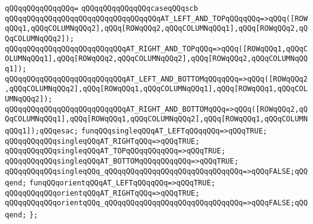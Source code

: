 \verb|qQQqqQQqqQQqqQQq=|\newline
\verb|qQQqqQQqqQQqqQQqcaseqQQqscb|\newline
\verb|qQQqqQQqqQQqqQQqqQQqqQQqqQQqqQQqqQQqAT_LEFT_AND_TOPqQQqqQQq=>qQQq([ROWqQQq1,qQQqCOLUMNqQQq2],qQQq[ROWqQQq2,qQQqCOLUMNqQQq1],qQQq[ROWqQQq2,qQQqCOLUMNqQQq2]);|\newline
\verb|qQQqqQQqqQQqqQQqqQQqqQQqqQQqAT_RIGHT_AND_TOPqQQq=>qQQq([ROWqQQq1,qQQqCOLUMNqQQq1],qQQq[ROWqQQq2,qQQqCOLUMNqQQq2],qQQq[ROWqQQq2,qQQqCOLUMNqQQq1]);|\newline
\verb|qQQqqQQqqQQqqQQqqQQqqQQqqQQqAT_LEFT_AND_BOTTOMqQQqqQQq=>qQQq([ROWqQQq2,qQQqCOLUMNqQQq2],qQQq[ROWqQQq1,qQQqCOLUMNqQQq1],qQQq[ROWqQQq1,qQQqCOLUMNqQQq2]);|\newline
\verb|qQQqqQQqqQQqqQQqqQQqqQQqqQQqAT_RIGHT_AND_BOTTOMqQQq=>qQQq([ROWqQQq2,qQQqCOLUMNqQQq1],qQQq[ROWqQQq1,qQQqCOLUMNqQQq2],qQQq[ROWqQQq1,qQQqCOLUMNqQQq1]);qQQqesac;|\newline
\newline
\verb|funqQQqsingleqQQqAT_LEFTqQQqqQQq=>qQQqTRUE;|\newline
\verb|qQQqqQQqqQQqsingleqQQqAT_RIGHTqQQq=>qQQqTRUE;|\newline
\verb|qQQqqQQqqQQqsingleqQQqAT_TOPqQQqqQQqqQQq=>qQQqTRUE;|\newline
\verb|qQQqqQQqqQQqsingleqQQqAT_BOTTOMqQQqqQQqqQQq=>qQQqTRUE;|\newline
\verb|qQQqqQQqqQQqsingleqQQq_qQQqqQQqqQQqqQQqqQQqqQQqqQQqqQQq=>qQQqFALSE;qQQqend;|\newline
\newline
\verb|funqQQqorientqQQqAT_LEFTqQQqqQQq=>qQQqTRUE;|\newline
\verb|qQQqqQQqqQQqorientqQQqAT_RIGHTqQQq=>qQQqTRUE;|\newline
\verb|qQQqqQQqqQQqorientqQQq_qQQqqQQqqQQqqQQqqQQqqQQqqQQqqQQq=>qQQqFALSE;qQQqend;|\newline
\newline
\newline
\newline
\verb|};|\newline
\newline
\newline

